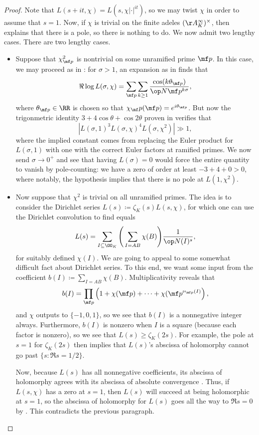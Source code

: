 \documentclass[../thesis.tex]{subfiles}
\begin{document}
\begin{proof}
	Note that $L(s+it,\chi)=L\left(s,\chi\left|\cdot\right|^{it}\right)$, so we may twist $\chi$ in order to assume that $s=1$. Now, if $\chi$ is trivial on the finite adeles $(\AA_K^\infty)^\times$, then  explains that there is a pole, so there is nothing to do. We now admit two lengthy cases.
	There are two lengthy cases.
	\begin{itemize}
		\item Suppose that $\chi^2_{\mf p}$ is nontrivial on some unramified prime $\mf p$. In this case, we may proceed as in : for $\sigma>1$, an expansion as in  finds that
		\[\Re\log L(\sigma,\chi)=\sum_{\mf p}\sum_{k\ge1}\frac{\cos(k\theta_{\mf p})}{\op N\mf p^{k\sigma}},\]
		where $\theta_{\mf p}\in\RR$ is chosen so that $\chi_\mf p(\mf p)=e^{i\theta_{\mf p}}$. But now the trigonmetric identity $3+4\cos\theta+\cos2\theta$ proven in  verifies that
		\[\left|L(\sigma,1)^3L(\sigma,\chi)^4L(\sigma,\chi^2)\right|\gg1,\]
		where the implied constant comes from replacing the Euler product for $L(\sigma,1)$ with one with the correct Euler factors at ramified primes. We now send $\sigma\to0^+$ and see that having $L(\sigma)=0$ would force the entire quantity to vanish by pole-counting: we have a zero of order at least $-3+4+0>0$, where notably, the hypothesis implies that there is no pole at $L(1,\chi^2)$.

		\item Now suppose that $\chi^2$ is trivial on all unramified primes. The idea is to consider the Dirichlet series $L(s)\coloneqq\zeta_K(s)L(s,\chi)$, for which one can use the Dirichlet convolution to find equals
		\[L(s)=\sum_{I\subseteq\OO_K}\Bigg(\sum_{I=AB}\chi(B)\Bigg)\frac1{\op N(I)^s},\]
		for suitably defined $\chi(I)$. We are going to appeal to some somewhat difficult fact about Dirichlet series. To this end, we want some input from the coefficient $b(I)\coloneqq\sum_{I=AB}\chi(B)$. Multiplicativity reveals that
		\[b(I)=\prod_{\mf p}\left(1+\chi(\mf p)+\cdots+\chi(\mf p^{\nu_{\mf p}(I)}\right),\]
		and $\chi$ outputs to $\{-1,0,1\}$, so we see that $b(I)$ is a nonnegative integer always. Furthermore, $b(I)$ is nonzero when $I$ is a square (because each factor is nonzero), so we see that $L(s)\ge\zeta_K(2s)$. For example, the pole at $s=1$ for $\zeta_K(2s)$ then implies that $L(s)$'s abscissa of holomorphy cannot go past $\{s:\Re s=1/2\}$.

		Now, because $L(s)$ has all nonnegative coefficients, its abscissa of holomorphy agrees with its abscissa of absolute convergence \cite[Lemmas~7-29]{rv-fourier-analysis-number-fields}. Thus, if $L(s,\chi)$ has a zero at $s=1$, then $L(s)$ will succeed at being holomorphic at $s=1$, so the abscissa of holomorphy for $L(s)$ goes all the way to $\Re s=0$ by . This contradicts the previous paragraph.
		\qedhere
	\end{itemize}
\end{proof}
\end{document}
